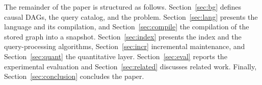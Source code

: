 The remainder of the paper is structured as follows.
Section~\ref{sec:bg} defines causal DAGs, the query catalog, and the problem.
Section~\ref{sec:lang} presents the language and its compilation, and
Section~\ref{sec:compile} the compilation of the stored graph into a snapshot.
Section~\ref{sec:index} presents the index and the query-processing
algorithms, Section~\ref{sec:incr} incremental maintenance, and
Section~\ref{sec:quant} the quantitative layer. Section~\ref{sec:eval} reports
the experimental evaluation and Section~\ref{sec:related} discusses related
work. Finally, Section~\ref{sec:conclusion} concludes the paper.
